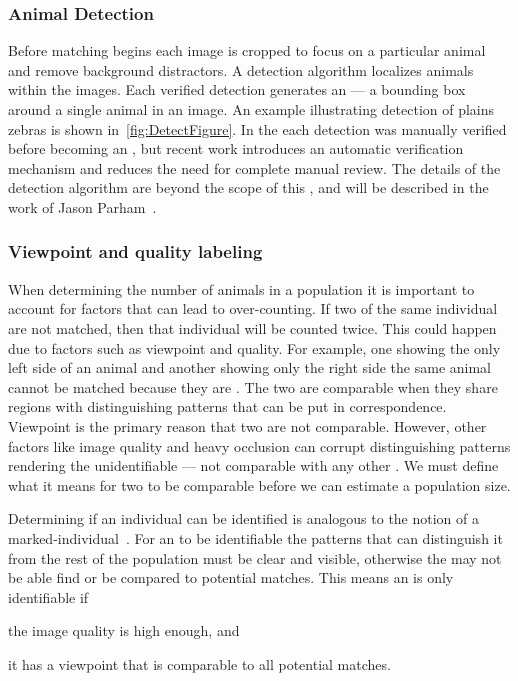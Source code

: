         \subsubsection{Animal Detection}
            Before matching begins each image is cropped to focus on a particular animal and remove background
            distractors. A detection algorithm localizes animals within the images. Each verified detection generates an
            \glossterm{\annot{}} --- a bounding box around a single animal in an image. An example illustrating
            detection of plains zebras is shown in~\cref{fig:DetectFigure}. In the \GZC{} each detection was manually
            verified before becoming an \annot{}, but recent work introduces an automatic verification mechanism and
            reduces the need for complete manual review. The details of the detection algorithm are beyond the scope of
            this \thesis{}, and will be described in the work of Jason Parham~\cite{parham_photographic_2015}.

            \DetectFigure{}

        \subsubsection{Viewpoint and quality labeling}\label{sub:viewqual}
            When determining the number of animals in a population it is important to account for factors that can lead
            to over-counting. If two \annots{} of the same individual are not matched, then that individual will be
            counted twice. This could happen due to factors such as viewpoint and quality. For example, one \annot{}
            showing the only left side of an animal and another \annot{} showing only the right side the same animal
            cannot be matched because they are . The two \annots{} are comparable when they
            share regions with distinguishing patterns that can be put in correspondence. Viewpoint is the primary
            reason that two \annots{} are not comparable. However, other factors like image quality and heavy occlusion
            can corrupt distinguishing patterns rendering the \annot{} unidentifiable --- not comparable with any other
            \annot{}. We must define what it means for two \annots{} to be comparable before we can estimate a
            population size.

            Determining if an individual can be identified is analogous to the
            notion of a marked-individual~\cite{seber_estimation_1982}. For an
            \annot{} to be identifiable the patterns that can distinguish it
            from the rest of the population must be clear and visible, otherwise
            the \annot{} may not be able find or be compared to potential
            matches. This means an \annot{} is only identifiable if
            \begin{enumin}
                \item the image quality is high enough, and %
                \item it has a viewpoint that is comparable to all potential
                matches. %
            \end{enumin}
            
